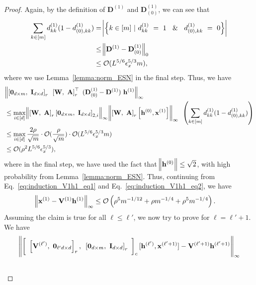 \begin{proof}
	Again, by the definition of $\mathbf{D}^{(1)}$ and $\mathbf{D}^{(1)}_{(0)}$, we can see that
	\begin{align*}
		\sum_{k \in [m]} d^{(1)}_{kk} (1 - d^{(1)}_{(0), kk}) &= \abs{\left\{k \in [m] \text{ } | \text{ }  d^{(1)}_{kk} \text{ }  =\text{ }  1 \text{ } \And \text{ }  d^{(1)}_{(0), kk} \text{ }  = \text{ }  0 \right\}} \\&
		\le \norm{\mathbf{D}^{(1)} - \mathbf{D}^{(1)}_{(0)}}_{0} \\& \le \mathcal{O}(L^{5/6} \epsilon_x^{5/3} m),
	\end{align*}
	where we use Lemma~\ref{lemma:norm_ESN} in the final step. Thus, we have
	\begin{align*}
		&\norm{\left[\mathbf{0}_{d \times m}, \text{ } \mathbf{I}_{d \times d}\right]_r  \text{ } \left[\mathbf{W}, \text{ } \mathbf{A}\right]_r^{\top} \text{ } (\mathbf{D}^{(1)}_{(0)} - \mathbf{D}^{(1)}) \text{ } \mathbf{h}^{(1)}}_\infty \\&\le \max_{i \in [d]} \norm{\left[\mathbf{W}, \text{ } \mathbf{A}\right]_r \left[\mathbf{0}_{d \times m}, \text{ } \mathbf{I}_{d \times d}\right]_{2, i}}_{\infty} \norm{\left[\mathbf{W}, \text{ } \mathbf{A}\right]_r \left[\mathbf{h}^{(0)}, \mathbf{x}^{(1)}\right]}_{\infty} \text{ }  \left( \sum_{k \in [m]} d^{(1)}_{kk} (1 - d^{(1)}_{(0), kk}) \right) \\& \leq \max_{i \in [d]} \frac{2\rho}{\sqrt{m}}  \cdot \mathcal{O}(\frac{\rho}{\sqrt{m}}) \cdot  \mathcal{O}(L^{5/6} \epsilon_x^{5/3} m) \\&
		\le \mathcal{O}(\rho^2 L^{5/6} \epsilon_x^{5/3}), 
	\end{align*}
	where in the final step, we have used the fact that $\norm{\mathbf{h}^{(0)}} \le \sqrt{2}$, with high probability from Lemma~\ref{lemma:norm_ESN}. 
	\fi
	Thus, continuing from Eq.~\ref{eq:induction_V1h1_eq1} and Eq.~\ref{eq:induction_V1h1_eq2}, we have
	\begin{align*}
		\norm{ \mathbf{x}^{(1)} - \mathbf{V}^{(1)}  \mathbf{h}^{(1)}}_\infty &\leq \mathcal{O}\left(\rho^5 m^{-1/12} + \rho m^{-1/4} + \rho^5 m^{-1/4} \right).
	\end{align*}
	Assuming the claim is true for all $\ell \le  \ell'$, we now try to prove for $\ell = \ell' + 1$.  We have
	\begingroup \allowdisplaybreaks
	\begin{align*}
		&\norm{ \left[\text{ }\left[\bV^{(\ell')}, \text{ } \mathbf{0}_{\ell'd \times d}\right]_r,\text{ } \left[\mathbf{0}_{d \times m},\text{ } \mathbf{I}_{d \times d}\right]_r\text{ }\right]_c [\mathbf{h}^{(\ell')}, \mathbf{x}^{(\ell' + 1)}] - \bV^{(\ell' + 1)}  \mathbf{h}^{(\ell' + 1)}}_\infty \\& 

\end{align*}
\end{proof}
